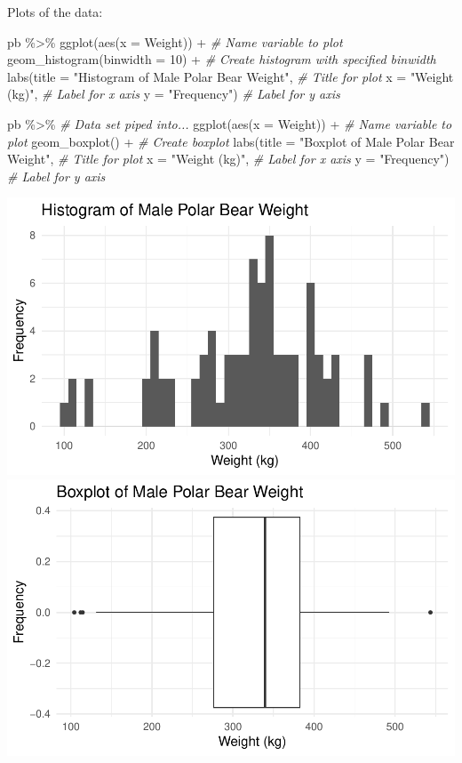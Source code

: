 \documentclass[
]{report}
\newenvironment{Shaded}{\begin{snugshade}}{\end{snugshade}}
\newcommand{\AttributeTok}[1]{\textcolor[rgb]{0.77,0.63,0.00}{#1}}
\newcommand{\CommentTok}[1]{\textcolor[rgb]{0.56,0.35,0.01}{\textit{#1}}}
\newcommand{\DecValTok}[1]{\textcolor[rgb]{0.00,0.00,0.81}{#1}}
\newcommand{\FunctionTok}[1]{\textcolor[rgb]{0.00,0.00,0.00}{#1}}
\newcommand{\NormalTok}[1]{#1}
\newcommand{\SpecialCharTok}[1]{\textcolor[rgb]{0.00,0.00,0.00}{#1}}
\newcommand{\StringTok}[1]{\textcolor[rgb]{0.31,0.60,0.02}{#1}}
\begin{document}
Plots of the data:

\begin{Shaded}
\begin{Highlighting}[]
\NormalTok{pb }\SpecialCharTok{\%\textgreater{}\%}
    \FunctionTok{ggplot}\NormalTok{(}\FunctionTok{aes}\NormalTok{(}\AttributeTok{x =}\NormalTok{ Weight)) }\SpecialCharTok{+}   \CommentTok{\# Name variable to plot}
    \FunctionTok{geom\_histogram}\NormalTok{(}\AttributeTok{binwidth =} \DecValTok{10}\NormalTok{) }\SpecialCharTok{+}  \CommentTok{\# Create histogram with specified binwidth }
    \FunctionTok{labs}\NormalTok{(}\AttributeTok{title =} \StringTok{"Histogram of Male Polar Bear Weight"}\NormalTok{, }\CommentTok{\# Title for plot}
       \AttributeTok{x =} \StringTok{"Weight (kg)"}\NormalTok{, }\CommentTok{\# Label for x axis}
       \AttributeTok{y =} \StringTok{"Frequency"}\NormalTok{) }\CommentTok{\# Label for y axis}

\NormalTok{pb }\SpecialCharTok{\%\textgreater{}\%} \CommentTok{\# Data set piped into...}
\FunctionTok{ggplot}\NormalTok{(}\FunctionTok{aes}\NormalTok{(}\AttributeTok{x =}\NormalTok{ Weight)) }\SpecialCharTok{+}   \CommentTok{\# Name variable to plot}
  \FunctionTok{geom\_boxplot}\NormalTok{() }\SpecialCharTok{+}  \CommentTok{\# Create boxplot }
  \FunctionTok{labs}\NormalTok{(}\AttributeTok{title =} \StringTok{"Boxplot of Male Polar Bear Weight"}\NormalTok{, }\CommentTok{\# Title for plot}
       \AttributeTok{x =} \StringTok{"Weight (kg)"}\NormalTok{, }\CommentTok{\# Label for x axis}
       \AttributeTok{y =} \StringTok{"Frequency"}\NormalTok{) }\CommentTok{\# Label for y axis}
\end{Highlighting}
\end{Shaded}

\begin{center}\includegraphics[width=0.6\linewidth]{11-LN011-paired_files/figure-latex/unnamed-chunk-2-1} \includegraphics[width=0.6\linewidth]{11-LN011-paired_files/figure-latex/unnamed-chunk-2-2} \end{center}
\end{document}
